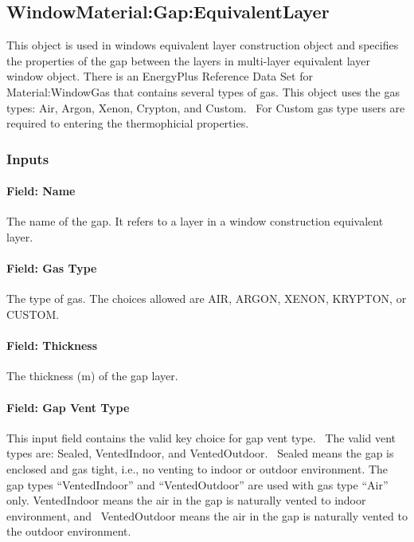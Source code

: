 \subsection{WindowMaterial:Gap:EquivalentLayer}\label{windowmaterialgapequivalentlayer}

This object is used in windows equivalent layer construction object and specifies the properties of the gap between the layers in multi-layer equivalent layer window object. There is an EnergyPlus Reference Data Set for Material:WindowGas that contains several types of gas. This object uses the gas types: Air, Argon, Xenon, Crypton, and Custom.~ For Custom gas type users are required to entering the thermophicial properties.

\subsubsection{Inputs}\label{inputs-31-001}

\paragraph{Field: Name}\label{field-name-25-002}

The name of the gap. It refers to a layer in a window construction equivalent layer.

\paragraph{Field: Gas Type}\label{field-gas-type-1}

The type of gas. The choices allowed are AIR, ARGON, XENON, KRYPTON, or CUSTOM.

\paragraph{Field: Thickness}\label{field-thickness-8}

The thickness (m) of the gap layer.

\paragraph{Field: Gap Vent Type}\label{field-gap-vent-type}

This input field contains the valid key choice for gap vent type.~ The valid vent types are: Sealed, VentedIndoor, and VentedOutdoor.~ Sealed means the gap is enclosed and gas tight, i.e., no venting to indoor or outdoor environment. The gap types ``VentedIndoor'' and ``VentedOutdoor'' are used with gas type ``Air'' only. VentedIndoor means the air in the gap is naturally vented to indoor environment, and~ VentedOutdoor means the air in the gap is naturally vented to the outdoor environment.

